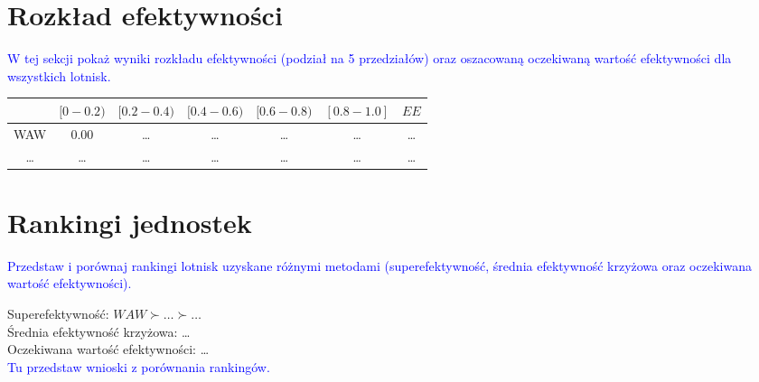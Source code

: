 \documentclass[a4paper,12pt]{article}
\begin{document}
\section{Rozkład efektywności}
\textcolor{blue}{W tej sekcji pokaż wyniki rozkładu efektywności (podział na 5 przedziałów) oraz oszacowaną oczekiwaną wartość efektywności dla wszystkich lotnisk.}
\begin{table}[H]
\begin{tabular}{c|ccccc|c}
\hline
    & $[0-0.2)$ & $[0.2-0.4)$ & $[0.4-0.6)$ & $[0.6-0.8)$ & $[0.8-1.0]$ & $EE$    \\ \hline
WAW & 0.00      & \ldots & \ldots & \ldots & \ldots & \ldots \\
\ldots & \ldots & \ldots & \ldots & \ldots & \ldots & \ldots \\
\hline
\end{tabular}
\label{tab:efficiency-distribution}
\end{table}

\section{Rankingi jednostek}
\textcolor{blue}{Przedstaw i porównaj rankingi lotnisk uzyskane różnymi metodami (superefektywność, średnia efektywność krzyżowa oraz oczekiwana wartość efektywności).}

\noindent Superefektywność: $WAW \succ \ldots \succ \ldots$ \\
Średnia efektywność krzyżowa: \ldots \\
Oczekiwana wartość efektywności: \ldots \\

\textcolor{blue}{Tu przedstaw wnioski z porównania rankingów.}
\end{document}
